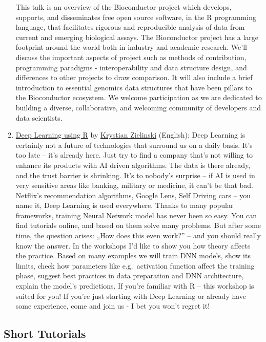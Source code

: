 \begin{enumerate}
  This talk is an overview of the Bioconductor project which develops, supports, and disseminates free open source software, in the R programming language, that facilitates rigorous and reproducible analysis of data from current and emerging biological assays. The Bioconductor project has a large footprint around the world both in industry and academic research. We'll discuss the important aspects of project such as methods of contribution, programming paradigms - interoperability and data structure design, and differences to other projects to draw comparison. It will also include a brief introduction to essential genomics data structures that have been pillars to the Bioconductor ecosystem. We welcome participation as we are dedicated to building a diverse, collaborative, and welcoming community of developers and data scientists.
\item
  \href{https://www.youtube.com/watch?v=Mg7e1B-J2Oo}{Deep Learning using R} by \href{https://www.linkedin.com/in/krystian-zieli\%C5\%84ski-53399a167/}{Krystian Zielinski} (English):
  Deep Learning is certainly not a future of technologies that surround us on a daily basis. It's too late -- it's already here. Just try to find a company that's not willing to enhance its products with AI driven algorithms. The data is there already, and the trust barrier is shrinking. It's to nobody's surprise -- if AI is used in very sensitive areas like banking, military or medicine, it can't be that bad. Netflix's recommendation algorithms, Google Lens, Self Driving cars -- you name it, Deep Learning is used everywhere. Thanks to many popular frameworks, training Neural Network model has never been so easy. You can find tutorials online, and based on them solve many problems. But after some time, the question arises: „How does this even work?'' -- and you should really know the answer. In the workshops I'd like to show you how theory affects the practice. Based on many examples we will train DNN models, show its limits, check how parameters like e.g.~activation function affect the training phase, suggest best practices in data preparation and DNN architecture, explain the model's predictions. If you're familiar with R -- this workshop is suited for you! If you're just starting with Deep Learning or already have some experience, come and join us - I bet you won't regret it!
\end{enumerate}

\hypertarget{short-tutorials}{%
\subsection{Short Tutorials}\label{short-tutorials}}

